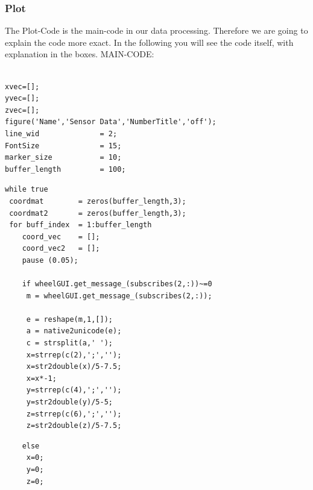 \documentclass[12pt]{article}
\begin{document}
\subsubsection{Plot}
The Plot-Code is the main-code in our data processing. Therefore we are going to explain the code more exact. In the following you will see the code itself, with explanation in the boxes.
\newline
\newline MAIN-CODE:
\lstset{basicstyle=\small,
	breaklines=true,
	language=java,
	showspaces=false,
	showtabs=false}
\begin{lstlisting}

xvec=[];
yvec=[];
zvec=[];
figure('Name','Sensor Data','NumberTitle','off');
line_wid              = 2;
FontSize              = 15;
marker_size           = 10;
buffer_length         = 100;
\end{lstlisting}
\begin{lstlisting}
while true
 coordmat        = zeros(buffer_length,3);
 coordmat2       = zeros(buffer_length,3);
 for buff_index  = 1:buffer_length
	coord_vec    = [];
	coord_vec2   = [];
	pause (0.05);

	if wheelGUI.get_message_(subscribes(2,:))~=0
	 m = wheelGUI.get_message_(subscribes(2,:));

	 e = reshape(m,1,[]);
	 a = native2unicode(e);
	 c = strsplit(a,' ');
 	 x=strrep(c(2),';','');
	 x=str2double(x)/5-7.5;
	 x=x*-1;
	 y=strrep(c(4),';','');
	 y=str2double(y)/5-5;
	 z=strrep(c(6),';','');
	 z=str2double(z)/5-7.5;
	 \end{lstlisting}
	 \begin{lstlisting}
	else
	 x=0;
 	 y=0;
 	 z=0;
 	 \end{lstlisting}
\end{document}
